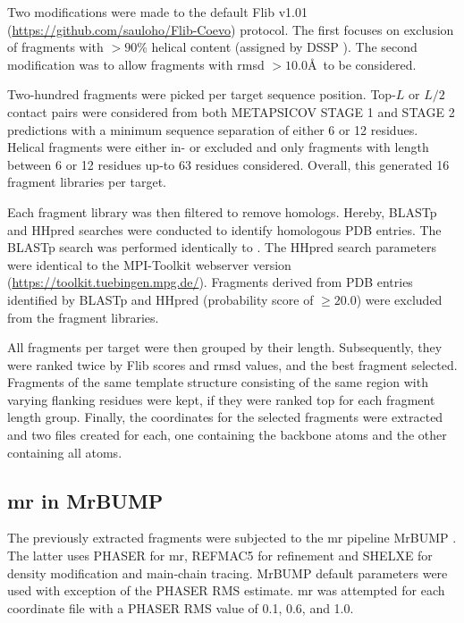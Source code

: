 Two modifications were made to the default Flib v1.01 (\url{https://github.com/sauloho/Flib-Coevo}) protocol. The first focuses on exclusion of fragments with $>90$\% helical content (assigned by DSSP \cite{Frishman1995-ns}). The second modification was to allow fragments with \gls{rmsd} $>10.0$\AA\ to be considered.

Two-hundred fragments were picked per target sequence position. Top-$L$ or $L/2$ contact pairs were considered from both METAPSICOV STAGE 1 and STAGE 2 predictions with a minimum sequence separation of either 6 or 12 residues. Helical fragments were either in- or excluded and only fragments with length between 6 or 12 residues up-to 63 residues considered. Overall, this generated 16 fragment libraries per target.

Each fragment library was then filtered to remove homologs. Hereby, BLASTp and HHpred \cite{Soding2005-sx} searches were conducted to identify homologous PDB entries. The BLASTp search was performed identically to \cite{De_Oliveira2015-ba}. The HHpred search parameters were identical to the MPI-Toolkit \cite{Biegert2006-ny} webserver version (\url{https://toolkit.tuebingen.mpg.de/}). Fragments derived from PDB entries identified by BLASTp and HHpred (probability score of $\geq20.0$) were excluded from the fragment libraries.

All fragments per target were then grouped by their length. Subsequently, they were ranked twice by Flib scores and \gls{rmsd} values, and the best fragment selected. Fragments of the same template structure consisting of the same region with varying flanking residues were kept, if they were ranked top for each fragment length group. Finally, the coordinates for the selected fragments were extracted and two files created for each, one containing the backbone atoms and the other containing all atoms.

\subsection{\acrlong{mr} in MrBUMP}
The previously extracted fragments were subjected to the \gls{mr} pipeline MrBUMP \cite{Keegan2008-hk}. The latter uses PHASER \cite{McCoy2007-bf} for \gls{mr}, REFMAC5 \cite{Murshudov2011-we} for refinement and SHELXE \cite{Thorn2013-ir} for density modification and main-chain tracing. MrBUMP default parameters were used with exception of the PHASER RMS estimate. \gls{mr} was attempted for each coordinate file with a PHASER RMS value of 0.1, 0.6, and 1.0.

